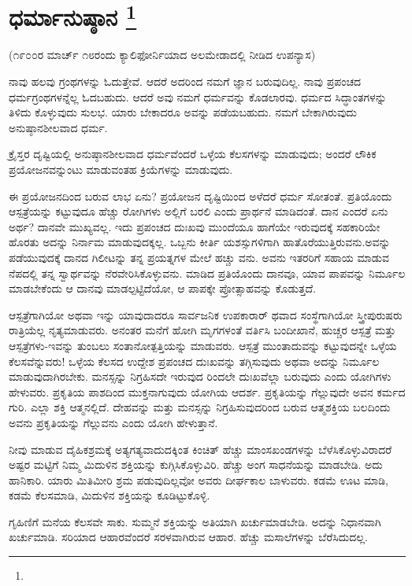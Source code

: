 
\chapter[ಧರ್ಮಾನುಷ್ಠಾನ ]{ಧರ್ಮಾನುಷ್ಠಾನ \protect\footnote{}}

\centerline{(೧೯೦೦ರ ಮಾರ್ಚ್​ ೧೮ರಂದು ಕ್ಯಾಲಿಫೋರ್ನಿಯಾದ ಅಲಮೇಡಾದಲ್ಲಿ ನೀಡಿದ ಉಪನ್ಯಾಸ)}

ನಾವು ಹಲವು ಗ್ರಂಥಗಳನ್ನು ಓದುತ್ತೇವೆ. ಆದರೆ ಅದರಿಂದ ನಮಗೆ ಜ್ಞಾನ ಬರುವುದಿಲ್ಲ. ನಾವು ಪ್ರಪಂಚದ ಧರ್ಮಗ್ರಂಥಗಳನ್ನೆಲ್ಲ ಓದಬಹುದು. ಆದರೆ ಅವು ನಮಗೆ ಧರ್ಮವನ್ನು ಕೊಡಲಾರವು. ಧರ್ಮದ ಸಿದ್ಧಾಂತಗಳನ್ನು ತಿಳಿದು ಕೊಳ್ಳುವುದು ಸುಲಭ. ಯಾರು ಬೇಕಾದರೂ ಅವನ್ನು ಪಡೆಯಬಹುದು. ನಮಗೆ ಬೇಕಾಗಿರುವುದು ಅನುಷ್ಠಾನಶೀಲವಾದ ಧರ್ಮ.

ಕ್ರೈಸ್ತರ ದೃಷ್ಟಿಯಲ್ಲಿ ಅನುಷ್ಠಾನಶೀಲವಾದ ಧರ್ಮವೆಂದರೆ ಒಳ್ಳೆಯ ಕೆಲಸಗಳನ್ನು ಮಾಡುವುದು; ಅಂದರೆ ಲೌಕಿಕ ಪ್ರಯೋಜನವನ್ನುಂಟು ಮಾಡುವಂತಹ ಕ್ರಿಯೆಗಳನ್ನು ಮಾಡುವುದು.

ಈ ಪ್ರಯೋಜನದಿಂದ ಬರುವ ಲಾಭ ಏನು? ಪ್ರಯೋಜನ ದೃಷ್ಟಿಯಿಂದ ಅಳೆದರೆ ಧರ್ಮ ಸೋತಂತೆ. ಪ್ರತಿಯೊಂದು ಆಸ್ಪತ್ರೆಯನ್ನು ಕಟ್ಟುವುದೂ ಹೆಚ್ಚು ರೋಗಿಗಳು ಅಲ್ಲಿಗೆ ಬರಲಿ ಎಂದು ಪ್ರಾರ್ಥನೆ ಮಾಡಿದಂತೆ. ದಾನ ಎಂದರೆ ಏನು ಅರ್ಥ? ದಾನವೇ ಮುಖ್ಯವಲ್ಲ. ಇದು ಪ್ರಪಂಚದ ದುಃಖವು ಮುಂದೆಯೂ ಹಾಗೆಯೇ ಇರುವುದಕ್ಕೆ ಸಹಕಾರಿಯೇ ಹೊರತು ಅದನ್ನು ನಿರ್ನಾಮ ಮಾಡುವುದಕ್ಕಲ್ಲ. ಒಬ್ಬನು ಕೀರ್ತಿ ಯಶಸ್ಸುಗಳಿಗಾಗಿ ಹಾತೊರೆಯುತ್ತಿರುವನು.ಅವನ್ನು ಪಡೆಯುವುದಕ್ಕೆ ದಾನದ ಗಿಲೀಟನ್ನು ತನ್ನ ಪ್ರಯತ್ನಗಳ ಮೇಲೆ ಹಚ್ಚು ವನು. ಅವನು ಇತರರಿಗೆ ಸಹಾಯ ಮಾಡುವ ನೆಪದಲ್ಲಿ ತನ್ನ ಸ್ವಾರ್ಥವನ್ನು ನೆರವೇರಿಸಿಕೊಳ್ಳುವನು. ಮಾಡಿದ ಪ್ರತಿಯೊಂದು ದಾನವೂ, ಯಾವ ಪಾಪವನ್ನು ನಿರ್ಮೂಲ ಮಾಡಬೇಕೆಂದು ಆ ದಾನವು ಮಾಡಲ್ಪಟ್ಟಿದೆಯೋ, ಆ ಪಾಪಕ್ಕೇ ಪ್ರೋತ್ಸಾಹವನ್ನು ಕೊಡುತ್ತದೆ.

ಆಸ್ಪತ್ರೆಗಾಗಿಯೋ ಅಥವಾ ಇನ್ನು ಯಾವುದಾದರೂ ಸಾರ್ವಜನಿಕ ಉಪಕಾರಾರ್ ಥವಾದ ಸಂಸ್ಥೆಗಾಗಿಯೋ ಸ್ತ್ರೀಪುರುಷರು ರಾತ್ರಿಯೆಲ್ಲ ನೃತ್ಯಮಾಡುವರು. ಅನಂತರ ಮನೆಗೆ ಹೋಗಿ ಮೃಗಗಳಂತೆ ವರ್ತಿಸಿ ಬಂದೀಖಾನೆ, ಹುಚ್ಚರ ಆಸ್ಪತ್ರೆ ಮತ್ತು ಆಸ್ಪತ್ರೆಗಳು-ಇವನ್ನು ತುಂಬಲು ಸಂತಾನೋತ್ಪತ್ತಿಯನ್ನು ಮಾಡುವರು. ಆಸ್ಪತ್ರೆ ಮುಂತಾದುವನ್ನು ಕಟ್ಟುವುದನ್ನೇ ಒಳ್ಳೆಯ ಕೆಲಸವೆನ್ನುವರು! ಒಳ್ಳೆಯ ಕೆಲಸದ ಉದ್ದೇಶ ಪ್ರಪಂಚದ ದುಃಖವನ್ನು ತಗ್ಗಿಸುವುದು ಅಥವಾ ಅದನ್ನು ನಿರ್ಮೂಲ ಮಾಡುವುದಾಗಿರಬೇಕು. ಮನಸ್ಸನ್ನು ನಿಗ್ರಹಿಸದೇ ಇರುವುದ ರಿಂದಲೇ ದುಃಖವೆಲ್ಲಾ ಬರುವುದು ಎಂದು ಯೋಗಿಗಳು ಹೇಳುವರು. ಪ್ರಕೃತಿಯ ಪಾಶದಿಂದ ಮುಕ್ತನಾಗುವುದು ಯೋಗಿಯ ಆದರ್ಶ. ಪ್ರಕೃತಿಯನ್ನು ಗೆಲ್ಲುವುದೇ ಅವನ ಕರ್ಮದ ಗುರಿ. ಎಲ್ಲಾ ಶಕ್ತಿ ಆತ್ಮನಲ್ಲಿದೆ. ದೇಹವನ್ನು ಮತ್ತು ಮನಸ್ಸನ್ನು ನಿಗ್ರಹಿಸುವುದರಿಂದ ಬರುವ ಆತ್ಮಶಕ್ತಿಯ ಬಲದಿಂದು ಅವನು ಪ್ರಕೃತಿಯನ್ನು ಗೆಲ್ಲುವನು ಎಂದು ಯೋಗಿ ಹೇಳುತ್ತಾನೆ.

ನೀವು ಮಾಡುವ ದೈಹಿಕಶ್ರಮಕ್ಕೆ ಅತ್ಯಗತ್ಯವಾದುದಕ್ಕಿಂತ ಕಿಂಚಿತ್​ ಹೆಚ್ಚು ಮಾಂಸಖಂಡಗಳನ್ನು ಬೆಳೆಸಿಕೊಳ್ಳುವಿರಾದರೆ ಅಷ್ಟರ ಮಟ್ಟಿಗೆ ನಿಮ್ಮ ಮಿದುಳಿನ ಶಕ್ತಿಯನ್ನು ಕುಗ್ಗಿಸಿಕೊಳ್ಳುವಿರಿ. ಹೆಚ್ಚು ಅಂಗ ಸಾಧನೆಯನ್ನು ಮಾಡಬೇಡಿ. ಅದು ಹಾನಿಕಾರಿ. ಯಾರು ಮಿತಿಮೀರಿ ಶ್ರಮ ಪಡುವುದಿಲ್ಲವೋ ಅವರು ದೀರ್ಘಕಾಲ ಬಾಳುವರು. ಕಡಮೆ ಊಟ ಮಾಡಿ, ಕಡಮೆ ಕೆಲಸಮಾಡಿ, ಮಿದುಳಿನ ಶಕ್ತಿಯನ್ನು ಕೂಡಿಟ್ಟುಕೊಳ್ಳಿ.

ಗೃಹಿಣಿಗೆ ಮನೆಯ ಕೆಲಸವೇ ಸಾಕು. ಸುಮ್ಮನೆ ಶಕ್ತಿಯನ್ನು ಅತಿಯಾಗಿ ಖರ್ಚುಮಾಡಬೇಡಿ. ಅದನ್ನು ನಿಧಾನವಾಗಿ ಖರ್ಚುಮಾಡಿ. ಸರಿಯಾದ ಆಹಾರವೆಂದರೆ ಸರಳವಾಗಿರುವ ಆಹಾರ. ಹೆಚ್ಚು ಮಸಾಲೆಗಳನ್ನು ಬೆರೆಸಿದುದಲ್ಲ.

